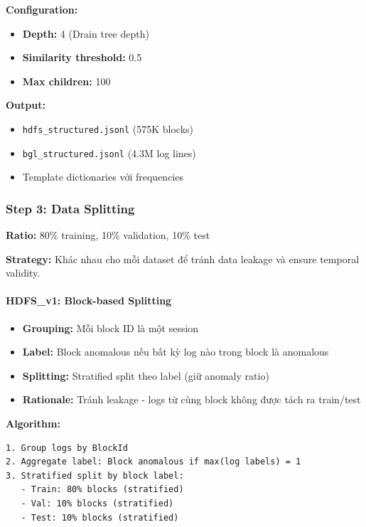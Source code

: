 \textbf{Configuration:}
\begin{itemize}
    \item \textbf{Depth:} 4 (Drain tree depth)
    \item \textbf{Similarity threshold:} 0.5
    \item \textbf{Max children:} 100
\end{itemize}

\textbf{Output:}
\begin{itemize}
    \item \texttt{hdfs\_structured.jsonl} (575K blocks)
    \item \texttt{bgl\_structured.jsonl} (4.3M log lines)
    \item Template dictionaries với frequencies
\end{itemize}

\subsubsection{Step 3: Data Splitting}

\textbf{Ratio:} 80\% training, 10\% validation, 10\% test

\textbf{Strategy:} Khác nhau cho mỗi dataset để tránh data leakage và ensure temporal validity.

\paragraph{HDFS\_v1: Block-based Splitting}

\begin{itemize}
    \item \textbf{Grouping:} Mỗi block ID là một session
    \item \textbf{Label:} Block anomalous nếu bất kỳ log nào trong block là anomalous
    \item \textbf{Splitting:} Stratified split theo label (giữ anomaly ratio)
    \item \textbf{Rationale:} Tránh leakage - logs từ cùng block không được tách ra train/test
\end{itemize}

\textbf{Algorithm:}
\begin{verbatim}
1. Group logs by BlockId
2. Aggregate label: Block anomalous if max(log labels) = 1
3. Stratified split by block label:
   - Train: 80% blocks (stratified)
   - Val: 10% blocks (stratified)
   - Test: 10% blocks (stratified)
\end{verbatim}

